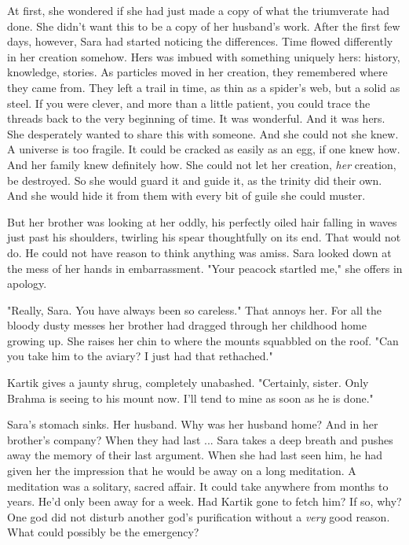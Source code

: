 \documentclass{article}
\begin{document}
At first, she wondered if she had just made a copy of what the triumverate had done. She didn't want this to be a copy of her husband's work. After the first few days, however, Sara had started noticing the differences. Time flowed differently in her creation somehow. Hers was imbued with something uniquely hers: history, knowledge, stories. As particles moved in her creation, they remembered where they came from. They left a trail in time, as thin as a spider's web, but a solid as steel. If you were clever, and more than a little patient, you could trace the threads back to the very beginning of time. It was wonderful. And it was hers. She desperately wanted to share this with someone. And she could not she knew. A universe is too fragile. It could be cracked as easily as an egg, if one knew how. And her family knew definitely how. She could not let her creation, \emph{her} creation, be destroyed. So she would guard it and guide it, as the trinity did their own. And she would hide it from them with every bit of guile she could muster.

But her brother was looking at her oddly, his perfectly oiled hair falling in waves just past his shoulders, twirling his spear thoughtfully on its end. That would not do. He could not have reason to think anything was amiss. Sara looked down at the mess of her hands in embarrassment. "Your peacock startled me," she offers in apology. 

"Really, Sara. You have always been so careless." That annoys her. For all the bloody dusty messes her brother had dragged through her childhood home growing up. She raises her chin to where the mounts squabbled on the roof. "Can you take him to the aviary? I just had that rethached." 

Kartik gives a jaunty shrug, completely unabashed. "Certainly, sister. Only Brahma is seeing to his mount now. I'll tend to mine as soon as he is done."

Sara's stomach sinks. Her husband. Why was her husband home? And in her brother's company? When they had last ... Sara takes a deep breath and pushes away the memory of their last argument. When she had last seen him, he had given her the impression that he would be away on a long meditation. A meditation was a solitary, sacred affair. It could take anywhere from months to years. He'd only been away for a week. Had Kartik gone to fetch him? If so, why? One god did not disturb another god's purification without a \emph{very} good reason. What could possibly be the emergency?
\end{document}
